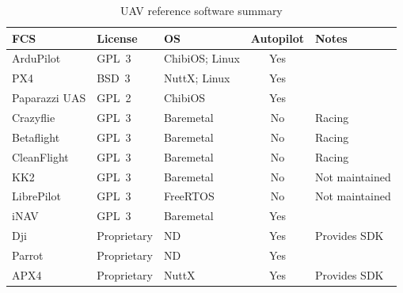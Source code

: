 \begin{table}[t]
  \centering
  \caption{UAV reference software summary}
  \label{tab:sw-ref}

  \begingroup
  \footnotesize
  \setlength{\tabcolsep}{4pt}      %
  \renewcommand{\arraystretch}{1.05}%

  \begin{tabular}{@{} l l l c l @{}}
    \toprule
    \textbf{FCS} & \textbf{License} & \textbf{OS} & \textbf{Autopilot} & \textbf{Notes} \\
    \midrule
    ArduPilot     & GPL~3        & ChibiOS; Linux & Yes & \\
    PX4           & BSD~3        & NuttX; Linux   & Yes & \\
    Paparazzi UAS & GPL~2        & ChibiOS        & Yes & \\
    Crazyflie     & GPL~3        & Baremetal      & No  & Racing \\
    Betaflight    & GPL~3        & Baremetal      & No  & Racing \\
    CleanFlight   & GPL~3        & Baremetal      & No  & Racing \\
    KK2           & GPL~3        & Baremetal      & No  & Not maintained \\
    LibrePilot    & GPL~3        & FreeRTOS       & No  & Not maintained \\
    iNAV          & GPL~3        & Baremetal      & Yes & \\
    Dji           & Proprietary  & ND             & Yes & Provides SDK \\
    Parrot        & Proprietary  & ND             & Yes & \\
    APX4          & Proprietary  & NuttX          & Yes & Provides SDK \\
    \bottomrule
  \end{tabular}

  \endgroup
\end{table}


